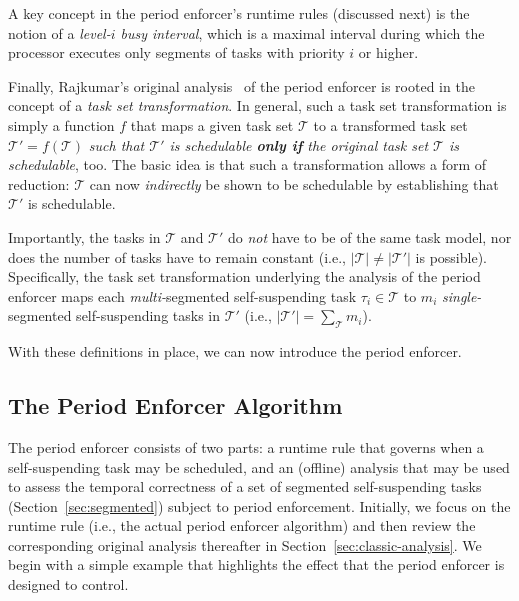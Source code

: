 A key concept in the period enforcer's runtime rules (discussed next) is the notion of a \emph{level-$i$ busy interval}, which is a maximal interval during which  the processor executes only segments of tasks with priority $i$ or higher.

\newcommand{\tset}[0]{\mathcal{T}}

Finally, Rajkumar's original analysis~\cite{Raj:suspension1991} of the period enforcer is rooted in the concept of a \emph{task set transformation}. In general, such a task set transformation is simply a function $f$ that maps a given task set $\tset$ to a transformed task set $\tset' = f(\tset)$ \emph{such that $\tset'$ is schedulable \textbf{only if} the original task set $\tset$ is schedulable}, too. The basic idea is that such a transformation allows a form of reduction: $\tset$ can now \emph{indirectly} be shown to be schedulable by establishing that $\tset'$ is schedulable.



Importantly, the tasks in $\tset$ and $\tset'$ do \emph{not} have to be of the same task model, nor does the number of tasks have to remain constant (i.e.,  $|\tset| \neq |\tset'|$ is possible). Specifically, the task set transformation underlying the analysis of the period enforcer maps each \emph{multi-}segmented self-suspending task $\tau_i \in \tset$  to $m_i$ \emph{single-}segmented self-suspending tasks in $\tset'$ (i.e., $|\tset'| = \sum_{\tset} m_i$).

With these definitions in place, we can now introduce the period enforcer. 



\subsection{The Period Enforcer Algorithm}
\label{sec:pe}

The period enforcer consists of two parts: a runtime rule that governs when a self-suspending task may be scheduled, and an (offline) analysis that may be used to assess the temporal correctness of a set of segmented self-suspending tasks (Section~\ref{sec:segmented}) subject to period enforcement. Initially, we focus on the runtime rule (i.e., the actual period enforcer algorithm) and then review the corresponding original analysis thereafter in Section~\ref{sec:classic-analysis}.  We begin with a simple example that highlights the effect that the period enforcer is designed to control.
 


